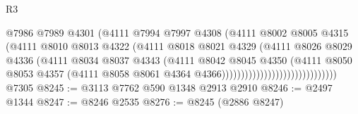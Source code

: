 \begin{lexlean}{R3}
\begin{coremodule}
                                              @7986
                                              @7989
                                              @4301
                                              (@4111
                                                @7994
                                                @7997
                                                @4308
                                                (@4111
                                                  @8002
                                                  @8005
                                                  @4315
                                                  (@4111
                                                    @8010
                                                    @8013
                                                    @4322
                                                    (@4111
                                                      @8018
                                                      @8021
                                                      @4329
                                                      (@4111
                                                        @8026
                                                        @8029
                                                        @4336
                                                        (@4111
                                                          @8034
                                                          @8037
                                                          @4343
                                                          (@4111
                                                            @8042
                                                            @8045
                                                            @4350
                                                            (@4111
                                                              @8050
                                                              @8053
                                                              @4357
                                                              (@4111
                                                                @8058
                                                                @8061
                                                                @4364
                                                                @4366))))))))))))))))))))))))))))))
    @7305
@8245 := @3113 @7762 @590 @1348 @2913 @2910
@8246 := @2497 @1344
@8247 := @8246 @2535
@8276 := @8245
    (@2886 @8247)

\end{coremodule}
\end{lexlean}
